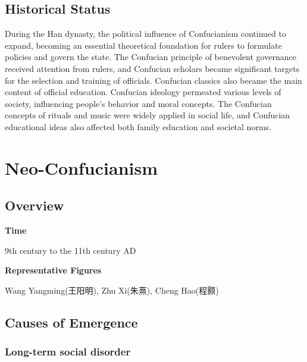 \documentclass[
]{book}
\begin{document}
\hypertarget{historical-status-1}{%
\section{Historical Status}\label{historical-status-1}}

During the Han dynasty, the political influence of Confucianism continued to expand, becoming an essential theoretical foundation for rulers to formulate policies and govern the state. The Confucian principle of benevolent governance received attention from rulers, and Confucian scholars became significant targets for the selection and training of officials. Confucian classics also became the main content of official education. Confucian ideology permeated various levels of society, influencing people's behavior and moral concepts. The Confucian concepts of rituals and music were widely applied in social life, and Confucian educational ideas also affected both family education and societal norms.

\hypertarget{neo-confucianism}{%
\chapter{Neo-Confucianism}\label{neo-confucianism}}

\hypertarget{overview-2}{%
\section{Overview}\label{overview-2}}

\textbf{Time}

9th century to the 11th century AD

\textbf{Representative Figures}

Wang Yangming(王阳明), Zhu Xi(朱熹), Cheng Hao(程颢)

\hypertarget{causes-of-emergence}{%
\section{Causes of Emergence}\label{causes-of-emergence}}

\hypertarget{long-term-social-disorder}{%
\subsection{Long-term social disorder}\label{long-term-social-disorder}}
\end{document}
